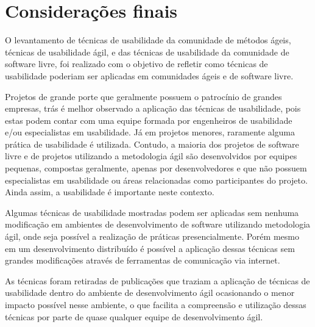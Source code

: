 \documentclass[12pt]{article}
\begin{document}
\section{Considerações finais}
\label{sec:con_final}

O levantamento de técnicas de usabilidade da comunidade de métodos ágeis, técnicas de usabilidade ágil, e das técnicas de usabilidade da comunidade de software livre, foi realizado com o objetivo de refletir como técnicas de usabilidade poderiam ser aplicadas em comunidades ágeis e de software livre.

%
Projetos de grande porte que geralmente possuem o patrocínio de grandes empresas, trás é melhor observado a aplicação das técnicas de usabilidade, pois estas podem contar com uma equipe formada por engenheiros de usabilidade e/ou especialistas em usabilidade. Já em projetos menores, raramente alguma prática de usabilidade é utilizada. Contudo, a maioria dos projetos de software livre e de projetos utilizando a metodologia ágil são desenvolvidos por equipes pequenas, compostas geralmente, apenas por desenvolvedores e que não possuem especialistas em usabilidade ou áreas relacionadas como participantes do projeto. Ainda assim, a usabilidade é importante neste contexto.

%
Algumas técnicas de usabilidade mostradas podem ser aplicadas sem nenhuma modificação em ambientes de desenvolvimento de software utilizando metodologia ágil, onde seja possível a realização de práticas presencialmente. Porém mesmo em um desenvolvimento distribuído é possível a aplicação dessas técnicas sem grandes modificações através de ferramentas de comunicação via internet.

%
As técnicas foram retiradas de publicações que traziam a aplicação de técnicas de usabilidade dentro do ambiente de desenvolvimento ágil ocasionando o menor impacto possível nesse ambiente, o que facilita a compreensão e utilização dessas técnicas por parte de quase qualquer equipe de desenvolvimento ágil.



\end{document}
